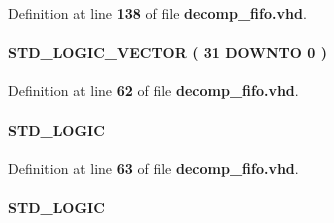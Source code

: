 Definition at line {\bf 138} of file {\bf decomp\+\_\+fifo.\+vhd}.

\paragraph[{sub\+\_\+wire0}]{ {\bfseries \textcolor{comment}{S\+T\+D\+\_\+\+L\+O\+G\+I\+C\+\_\+\+V\+E\+C\+T\+OR}\textcolor{vhdlchar}{ }\textcolor{vhdlchar}{(}\textcolor{vhdlchar}{ }\textcolor{vhdlchar}{ } \textcolor{vhdldigit}{31} \textcolor{vhdlchar}{ }\textcolor{keywordflow}{D\+O\+W\+N\+TO}\textcolor{vhdlchar}{ }\textcolor{vhdlchar}{ } \textcolor{vhdldigit}{0} \textcolor{vhdlchar}{ }\textcolor{vhdlchar}{)}\textcolor{vhdlchar}{ }} \hspace{0.3cm}{\ttfamily [Signal]}}\label{classdecomp__fifo_1_1SYN_a8b3791b90f4599898b227bcb6baf52d5}


Definition at line {\bf 62} of file {\bf decomp\+\_\+fifo.\+vhd}.

\paragraph[{sub\+\_\+wire1}]{ {\bfseries \textcolor{comment}{S\+T\+D\+\_\+\+L\+O\+G\+IC}\textcolor{vhdlchar}{ }} \hspace{0.3cm}{\ttfamily [Signal]}}\label{classdecomp__fifo_1_1SYN_a17dd32744e7223a428c475303567018e}


Definition at line {\bf 63} of file {\bf decomp\+\_\+fifo.\+vhd}.

\paragraph[{sub\+\_\+wire2}]{ {\bfseries \textcolor{comment}{S\+T\+D\+\_\+\+L\+O\+G\+IC}\textcolor{vhdlchar}{ }} \hspace{0.3cm}{\ttfamily [Signal]}}\label{classdecomp__fifo_1_1SYN_a0a0fd98f6683e3e62bb55434514ea0e3}


